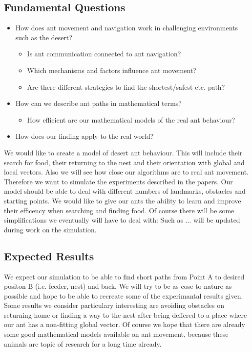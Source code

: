 \documentclass[11pt]{article}
\begin{document}
\subsection{Fundamental Questions}
\begin{itemize}
\item How does ant movement and navigation work in challenging environments such as the desert?
\begin{itemize}
\item Is ant communication connected to ant navigation?
\item Which mechanisms and factors influence ant movement?
\item Are there different strategies to find the shortest/safest etc. path?
\end{itemize}
\item How can we describe ant paths in mathematical terms?
\begin{itemize}
\item How efficient are our mathematical models of the real ant behaviour?
\end{itemize}
\item How does our finding apply to the real world?
\end{itemize}
We would like to create a model of desert ant behaviour. This will include their search for food, their returning to the nest and their orientation with global and local vectors. Also we will see how close our algorithms are to real ant movement. Therefore we want to simulate the experiments described in the papers. Our model should be able to deal with different numbers of landmarks, obstacles and starting points. We would like to give our ants the ability to learn and improve their efficency when searching and finding food. Of course there will be some simplifications we eventually will have to deal with: Such as ... will be updated during work on the simulation.

\subsection{Expected Results}

We expect our simulation to be able to find short paths from Point A to desired positon B (i.e. feeder, nest) and back. We will try to be as cose to nature as possible and hope to be able to recreate some of the experimantal results given. Some results we consider particulary interesting are avoiding obstacles on returning home or finding a way to the nest after being deffered to a place where our ant has a non-fitting global vector. Of course we hope that there are already some good mathematical models available on ant movement, because these animals are topic of research for a long time already.
\end{document}
